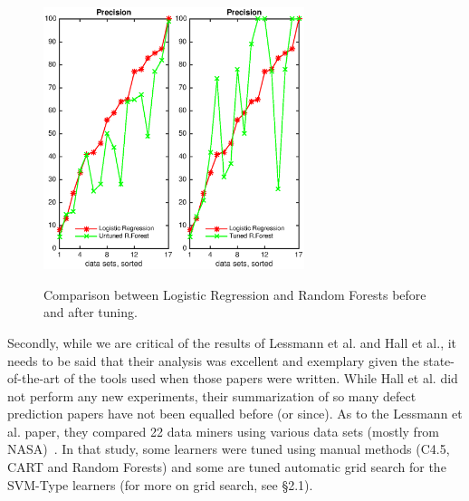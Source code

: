 \documentclass{sig-alternative}
\begin{document}
\begin{figure}[!t]
\begin{center}
\includegraphics[width=1.5in]{./eps/LR_untuned.eps}\includegraphics[width=1.5in]{./eps/LR_tuned.eps}
 \end{center}
\caption{Comparison between Logistic Regression and Random Forests before and after tuning. }\label{fig:lr}
 \end{figure}
 
Secondly, while we are critical of the results of
Lessmann et al. and Hall et al., it needs to be said that  their analysis  was 
excellent and exemplary given the state-of-the-art of the tools used when those papers were written.  
While Hall et al. did not perform any new experiments, 
their
summarization of so many defect prediction papers have not been equalled
before (or since).
As to the Lessmann et al. paper, they  compared
22 data miners using various   data sets (mostly from NASA)~\cite{lessmann2008benchmarking}.
In that study, some learners were tuned using manual methods 
(C4.5, CART and Random Forests)
and some are tuned automatic  grid search for the SVM-Type learners (for more on grid search, see   {\S}2.1).
\end{document}
